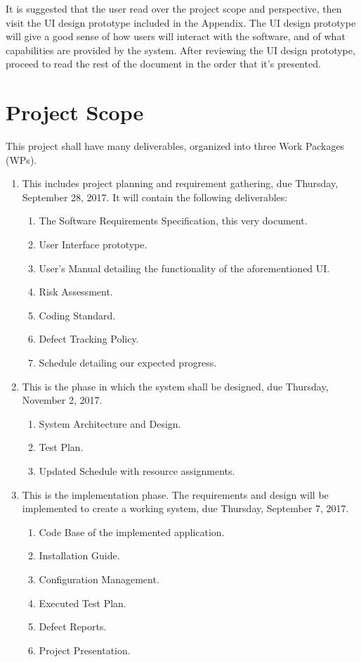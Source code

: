 \documentclass{scrreprt}
\begin{document}
It is suggested that the user read over the project scope and perspective, then
visit the UI design prototype included in the Appendix. The UI design prototype
will give a good sense of how users will interact with the software, and of what
capabilities are provided by the system. After reviewing the UI design prototype,
proceed to read the rest of the document in the order that it's presented.

\section{Project Scope}
This project shall have many deliverables, organized into three Work Packages (WPs).

\begin{enumerate}[label=\textbf{WP \arabic*.}]
    \item This includes project planning and requirement gathering, due Thursday, September 28, 2017.
    It will contain the following deliverables:
    \begin{enumerate}
        \item The Software Requirements Specification, this very document.
        \item User Interface prototype.
        \item User's Manual detailing the functionality of the aforementioned UI.
        \item Risk Assessment.
        \item Coding Standard.
        \item Defect Tracking Policy.
        \item Schedule detailing our expected progress.
    \end{enumerate}

    \item This is the phase in which the system shall be designed, due Thursday, November 2, 2017.
    \begin{enumerate}
        \item System Architecture and Design.
        \item Test Plan.
        \item Updated Schedule with resource assignments.
    \end{enumerate}

    \item This is the implementation phase. The requirements and design will be implemented to create a working system, due Thursday, September 7, 2017.
    \begin{enumerate}
        \item Code Base of the implemented application.
        \item Installation Guide.
        \item Configuration Management.
        \item Executed Test Plan.
        \item Defect Reports.
        \item Project Presentation.
    \end{enumerate}
\end{enumerate}
\end{document}
